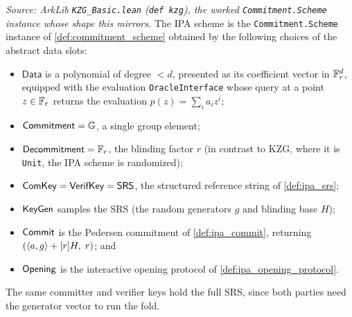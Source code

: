 \begin{definition}
  \label{def:ipa_scheme}
  \textit{Source: ArkLib \texttt{KZG\_Basic.lean} (\texttt{def kzg}), the worked
  \texttt{Commitment.Scheme} instance whose shape this mirrors.}
  The IPA scheme is the \texttt{Commitment.Scheme} instance of
  \cref{def:commitment_scheme} obtained by the following choices of the abstract
  data slots:
  \begin{itemize}
    \item \(\textsf{Data}\) is a polynomial of degree \(< d\), presented as its
      coefficient vector in \(\mathbb{F}_r^{d}\), equipped with the evaluation
      \texttt{OracleInterface} whose query at a point \(z \in \mathbb{F}_r\) returns the
      evaluation \(p(z) = \sum_{i} a_{i} z^{i}\);
    \item \(\textsf{Commitment} = \mathbb{G}\), a single group element;
    \item \(\textsf{Decommitment} = \mathbb{F}_r\), the blinding factor \(r\) (in contrast
      to KZG, where it is \texttt{Unit}, the IPA scheme is randomized);
    \item \(\textsf{ComKey} = \textsf{VerifKey} = \mathsf{SRS}\), the structured reference
      string of \cref{def:ipa_srs};
    \item \(\mathsf{KeyGen}\) samples the SRS (the random generators \(g\) and blinding
      base \(H\));
    \item \(\mathsf{Commit}\) is the Pedersen commitment of \cref{def:ipa_commit},
      returning \((\langle a, g \rangle + [r]H,\; r)\); and
    \item \(\mathsf{Opening}\) is the interactive opening protocol of
      \cref{def:ipa_opening_protocol}.
  \end{itemize}
  The same committer and verifier keys hold the full SRS, since both parties need
  the generator vector to run the fold.
\end{definition}

